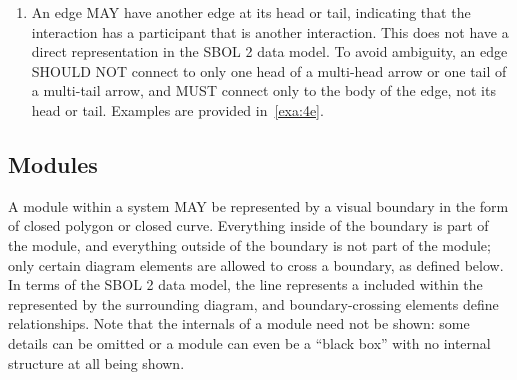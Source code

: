 \begin{enumerate}
\item An edge MAY have another edge at its head or tail, indicating that the interaction has a participant that is another interaction.
	This does not have a direct representation in the SBOL 2 data model. %
	To avoid ambiguity, an edge SHOULD NOT connect to only one head of a multi-head arrow or one tail of a multi-tail arrow, and MUST connect only to the body of the edge, not its head or tail.
	Examples are provided in~\ref{exa:4e}.

\end{enumerate}

\subsection{Modules}

A module within a system MAY be represented by a visual boundary in the form of closed polygon or closed curve.
Everything inside of the boundary is part of the module, and everything outside of the boundary is not part of the module; only certain diagram elements are allowed to cross a boundary, as defined below.
In terms of the SBOL 2 data model, the line represents a  included within the  represented by the surrounding diagram, and boundary-crossing elements define  relationships.
Note that the internals of a module need not be shown: some details can be omitted or a module can even be a ``black box'' with no internal structure at all being shown.

